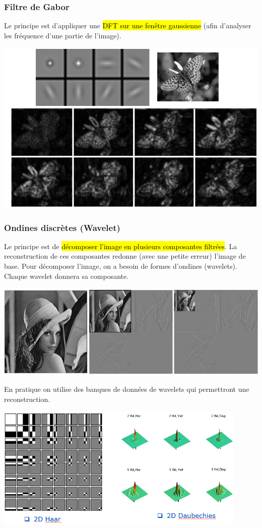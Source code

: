 \documentclass[letterpaper, 12pt]{article}
\newcommand{\alinea}{
\hspace*{0.5cm}}
\begin{document}
		\subsubsection{Filtre de Gabor}
			\alinea Le principe est d'appliquer une\hl{ DFT sur une fenêtre gaussienne} 
				(afin d'analyser les fréquence d'une partie de l'image).
				\begin{center}
					\includegraphics[width=5.5in]{Images/gabor}
				\end{center}
		\subsubsection{Ondines discrètes (Wavelet)}
			\alinea Le principe est de \hl{décomposer l'image en plusieurs composantes filtrées}. La reconstruction de ces composantes
				redonne (avec une petite erreur) l'image de base. Pour décomposer l'image, on a besoin de formes d'ondines (wavelets).
				Chaque wavelet donnera sa composante. 
			\begin{center}
				\includegraphics[width=6in]{Images/wavelets2}
			\end{center}
			\alinea En pratique on utilise des banques de données de wavelets qui permettront une reconstruction.			
			\begin{center}
				\includegraphics[width=4.75in]{Images/wavelets}
			\end{center}
%
\end{document}
